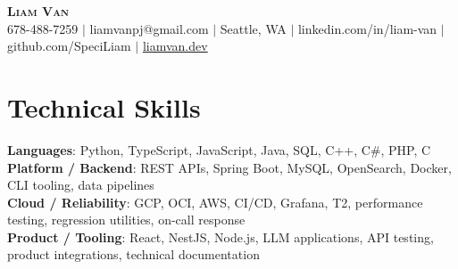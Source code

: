 \documentclass[letterpaper,11pt]{article}
\begin{document}

%
\begin{center}
    \textbf{\Huge \scshape Liam Van} \\ \vspace{1pt}
    \small 678-488-7259 $|$ \small {liamvanpj@gmail.com} $|$ Seattle, WA
 {{$|$ linkedin.com/in/liam-van} {$|$ github.com/SpeciLiam} {$|$ \href{https://liamvan.dev}{liamvan.dev}}}

\end{center}

\section{Technical Skills}
 \begin{itemize}[leftmargin=0.15in, label={}]
    \small{\item{
     \textbf{Languages}{: Python, TypeScript, JavaScript, Java, SQL, C++, C\#, PHP, C} \\
     \textbf{Platform / Backend}{: REST APIs, Spring Boot, MySQL, OpenSearch, Docker, CLI tooling, data pipelines} \\
     \textbf{Cloud / Reliability}{: GCP, OCI, AWS, CI/CD, Grafana, T2, performance testing, regression utilities, on-call response} \\
     \textbf{Product / Tooling}{: React, NestJS, Node.js, LLM applications, API testing, product integrations, technical documentation} \\
    }}
 \end{itemize}
%

\end{document}

